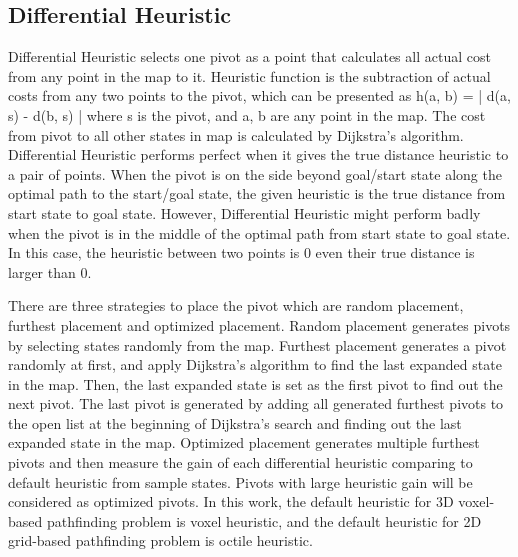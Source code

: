 \documentclass[twocolumn]{article}
\begin{document}
\subsection{Differential Heuristic}

Differential Heuristic selects one pivot as a point that calculates all actual cost from any point in the map to it. Heuristic function is the subtraction of actual costs from any two points to the pivot, which can be presented as h(a, b) = | d(a, s) - d(b, s) | where s is the pivot, and a, b are any point in the map. The cost from pivot to all other states in map is calculated by Dijkstra’s algorithm. Differential Heuristic performs perfect when it gives the true distance heuristic to a pair of points. When the pivot is on the side beyond goal/start state along the optimal path to the start/goal state, the given heuristic is the true distance from start state to goal state. However, Differential Heuristic might perform badly when the pivot is in the middle of the optimal path from start state to goal state. In this case, the heuristic between two points is 0 even their true distance is larger than 0. 



There are three strategies to place the pivot which are random placement, furthest placement and optimized placement. Random placement generates pivots by selecting states randomly from the map. Furthest placement generates a pivot randomly at first, and apply Dijkstra’s algorithm to find the last expanded state in the map. Then, the last expanded state is set as the first pivot to find out the next pivot. The last pivot is generated by adding all generated furthest pivots to the open list at the beginning of Dijkstra’s search and finding out the last expanded state in the map. Optimized placement generates multiple furthest pivots and then measure the gain of each differential heuristic comparing to default heuristic from sample states. Pivots with large heuristic gain will be considered as optimized pivots. In this work, the default heuristic for 3D voxel-based pathfinding problem is voxel heuristic, and the default heuristic for 2D grid-based pathfinding problem is octile heuristic. 
\end{document}
